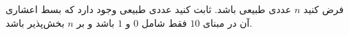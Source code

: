     \p 
فرض کنید
$n$
عددی طبیعی باشد. ثابت کنید عددی طبیعی وجود دارد که بسط اعشاری آن در مبنای
$10$
فقط شامل
$0$
و
$1$
باشد و بر
$n$
بخش‌پذیر باشد.